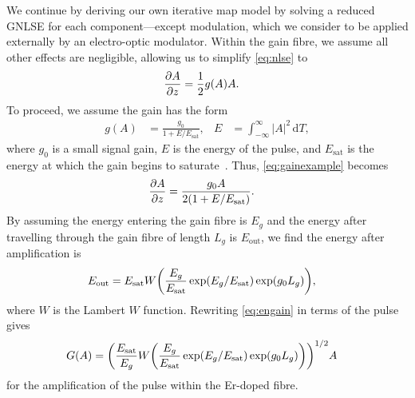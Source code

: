 \documentclass[9pt,twocolumn,twoside]{osajnl}
\let\originalleft\left
\let\originalright\right
\renewcommand{\left}{\mathopen{}\mathclose\bgroup\originalleft}
\renewcommand{\right}{\aftergroup\egroup\originalright}
\providecommand{\df}{\textrm{d}} %
\newcommand{\pdiff}[3][\hspace{-0.5pt}]{\frac{\partial^{#1}#2}{\partial{#3}^{#1}}} %
\newcommand{\Es}{E_{\textrm{sat}}} %
\begin{document}
We continue by deriving our own iterative map model by solving a reduced GNLSE for each component---except modulation, which we consider to be applied externally by an electro-optic modulator. Within the gain fibre, we assume all other effects are negligible, allowing us to simplify \eqref{eq:nlse} to
\begin{align}
	\pdiff{A}{z} &= \frac{1}{2}g(A)A.
	\label{eq:gainexample}
\end{align}
To proceed, we assume the gain has the form
\begin{align}
	g(A) &= \frac{g_0}{1 + E / \Es},& E &= \int_{-\infty}^\infty |A|^2 \, \df T,
	\label{eq:energy}
\end{align}
where $g_0$ is a small signal gain, $E$ is the energy of the pulse, and $\Es$ is the energy at which the gain begins to saturate~\cite{haus1984, shtyrina2017, silfvast2004}. Thus, \eqref{eq:gainexample} becomes
\begin{align}
	\pdiff{A}{z} &= \frac{g_0 A}{2 \left( 1 + E / \Es \right)}.
\end{align}
By assuming the energy entering the gain fibre is $E_g$ and the energy after travelling through the gain fibre of length $L_g$ is $E_{\text{out}}$, we find the energy after amplification is
\begin{align}
	\label{eq:engain}
	E_{\text{out}} &= \Es W \left( \frac{E_g}{\Es} \exp( E_g / \Es ) \exp( g_0 L_g ) \right),
\end{align}
where $W$ is the Lambert $W$ function. Rewriting \eqref{eq:engain} in terms of the pulse gives
\begin{align}
	G(A) &= \left( \frac{\Es}{E_g} W \left( \frac{E_g}{\Es} \exp( E_g / \Es ) \exp( g_0 L_g ) \right) \right)^{1/2} A
	\label{eq:gainform}
\end{align}
for the amplification of the pulse within the Er-doped fibre.
\end{document}
